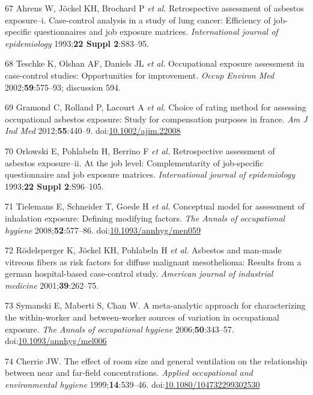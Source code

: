 \documentclass[12pt,a4paper,]{report}
\begin{document}
\leavevmode\hypertarget{ref-Ahrens1993}{}%
67 Ahrens W, Jöckel KH, Brochard P \emph{et al.} Retrospective
assessment of asbestos exposure--i. Case-control analysis in a study of
lung cancer: Efficiency of job-specific questionnaires and job exposure
matrices. \emph{International journal of epidemiology} 1993;\textbf{22
Suppl 2}:S83--95.

\leavevmode\hypertarget{ref-Teschke2002}{}%
68 Teschke K, Olshan AF, Daniels JL \emph{et al.} Occupational exposure
assessment in case-control studies: Opportunities for improvement.
\emph{Occup Environ Med} 2002;\textbf{59}:575--93; discussion 594.

\leavevmode\hypertarget{ref-Gramond2012}{}%
69 Gramond C, Rolland P, Lacourt A \emph{et al.} Choice of rating method
for assessing occupational asbestos exposure: Study for compensation
purposes in france. \emph{Am J Ind Med} 2012;\textbf{55}:440--9.
doi:\href{https://doi.org/10.1002/ajim.22008}{10.1002/ajim.22008}

\leavevmode\hypertarget{ref-Orlowski1993}{}%
70 Orlowski E, Pohlabeln H, Berrino F \emph{et al.} Retrospective
assessment of asbestos exposure--ii. At the job level: Complementarity
of job-specific questionnaire and job exposure matrices.
\emph{International journal of epidemiology} 1993;\textbf{22 Suppl
2}:S96--105.

\leavevmode\hypertarget{ref-Tielemans2008}{}%
71 Tielemans E, Schneider T, Goede H \emph{et al.} Conceptual model for
assessment of inhalation exposure: Defining modifying factors. \emph{The
Annals of occupational hygiene} 2008;\textbf{52}:577--86.
doi:\href{https://doi.org/10.1093/annhyg/men059}{10.1093/annhyg/men059}

\leavevmode\hypertarget{ref-Rodelsperger2001}{}%
72 Rödelsperger K, Jöckel KH, Pohlabeln H \emph{et al.} Asbestos and
man-made vitreous fibers as risk factors for diffuse malignant
mesothelioma: Results from a german hospital-based case-control study.
\emph{American journal of industrial medicine} 2001;\textbf{39}:262--75.

\leavevmode\hypertarget{ref-Symanski2006}{}%
73 Symanski E, Maberti S, Chan W. A meta-analytic approach for
characterizing the within-worker and between-worker sources of variation
in occupational exposure. \emph{The Annals of occupational hygiene}
2006;\textbf{50}:343--57.
doi:\href{https://doi.org/10.1093/annhyg/mel006}{10.1093/annhyg/mel006}

\leavevmode\hypertarget{ref-Cherrie1999a}{}%
74 Cherrie JW. The effect of room size and general ventilation on the
relationship between near and far-field concentrations. \emph{Applied
occupational and environmental hygiene} 1999;\textbf{14}:539--46.
doi:\href{https://doi.org/10.1080/104732299302530}{10.1080/104732299302530}
\end{document}
